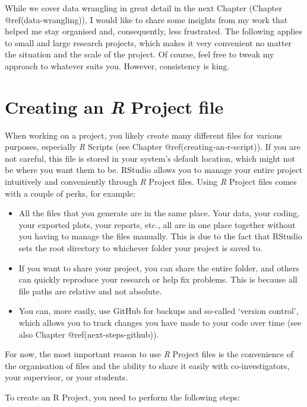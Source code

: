 \documentclass[
  letterpaper,
]{krantz}
\begin{document}
While we cover data wrangling in great detail in the next Chapter
(Chapter @ref(data-wrangling)), I would like to share some insights from
my work that helped me stay organised and, consequently, less
frustrated. The following applies to small and large research projects,
which makes it very convenient no matter the situation and the scale of
the project. Of course, feel free to tweak my approach to whatever suits
you. However, consistency is king.

\section{\texorpdfstring{Creating an \emph{R} Project
file}{Creating an R Project file}}\label{sec-creating-an-r-project}

When working on a project, you likely create many different files for
various purposes, especially \emph{R} Scripts (see Chapter
@ref(creating-an-r-script)). If you are not careful, this file is stored
in your system's default location, which might not be where you want
them to be. RStudio allows you to manage your entire project intuitively
and conveniently through \emph{R} Project files. Using \emph{R} Project
files comes with a couple of perks, for example:

\begin{itemize}
\item
  All the files that you generate are in the same place. Your data, your
  coding, your exported plots, your reports, etc., all are in one place
  together without you having to manage the files manually. This is due
  to the fact that RStudio sets the root directory to whichever folder
  your project is saved to.
\item
  If you want to share your project, you can share the entire folder,
  and others can quickly reproduce your research or help fix problems.
  This is because all file paths are relative and not absolute.
\item
  You can, more easily, use GitHub for backups and so-called `version
  control', which allows you to track changes you have made to your code
  over time (see also Chapter @ref(next-steps-github)).
\end{itemize}

For now, the most important reason to use \emph{R} Project files is the
convenience of the organisation of files and the ability to share it
easily with co-investigators, your supervisor, or your students.

To create an R Project, you need to perform the following steps:
\end{document}

